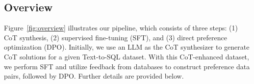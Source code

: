 


\subsection{Overview}
Figure~\ref{fig:overview} illustrates our pipeline, which consists of three steps: (1) CoT synthesis, (2) supervised fine-tuning (SFT), and (3) direct preference optimization (DPO). Initially, we use an LLM as the CoT synthesizer to generate CoT solutions for a given Text-to-SQL dataset. With this CoT-enhanced dataset, we perform SFT and utilize feedback from databases to construct preference data pairs, followed by DPO. Further details are provided below.


